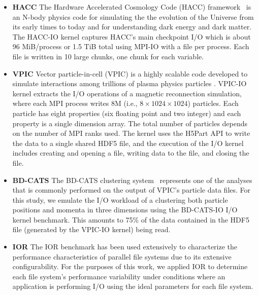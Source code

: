 \begin{itemize}
\item \textbf{HACC}
The Hardware Accelerated Cosmology Code (HACC) framework~\cite{habib2012}
is an N-body physics code for simulating the the evolution of the Universe
from its early times to today and for understanding dark energy and dark matter.
The HACC-IO kernel captures HACC's main checkpoint I/O which is about
96 MiB/process or 1.5 TiB total using MPI-IO with a file per process. Each
file is written in 10 large chunks, one chunk for each variable.
\item \textbf{VPIC} 
Vector particle-in-cell (VPIC) is a highly scalable code developed to simulate
interactions among trillions of plasma physics particles  \cite{Bowers2008}.
VPIC-IO kernel extracts the I/O operations of a magnetic reconnection
simulation, where each MPI process writes 8M (i.e., $8 \times 1024 \times 1024$) particles. Each
particle has eight properties (six floating point and two integer) and each
property is a single dimension array. The total number of particles depends on
the number of MPI ranks used. The kernel uses the H5Part API \cite{H5Part} to write
the data to a single shared HDF5 file, and the execution of the I/O kernel includes
creating and opening a file, writing data to the file, and closing the file.

\item \textbf{BD-CATS} The BD-CATS clustering system~\cite{Patwary2015}  represents
one of the analyses that is commonly performed on the output of VPIC's particle data files.
For this study, we emulate the I/O workload of a clustering both particle
positions and momenta in three dimensions using the BD-CATS-IO I/O kernel benchmark.  This amounts to 75\% of the data
contained in the HDF5 file (generated by the VPIC-IO kernel) being read.

\item \textbf{IOR} The IOR benchmark has been used extensively
to characterize the performance characteristics of parallel file systems\cite{Yildiz2016,Xie2012,Lofstead2010,Uselton2010}
due to its extensive configurability.  For the purposes of this work, we applied
IOR to determine each file system's performance variability under conditions
where an application is performing I/O using the ideal parameters for each
file system.

\end{itemize}

